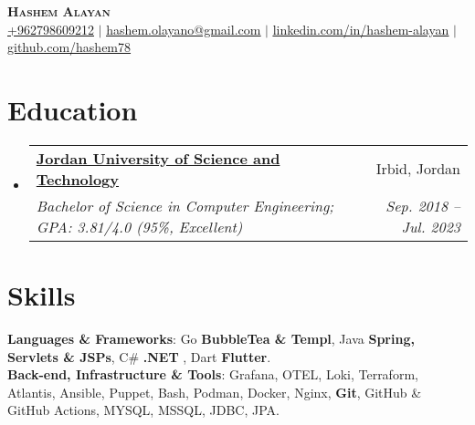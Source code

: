 \documentclass[letterpaper,11pt]{article}
\makeatletter
\newcommand{\resumeSubheading}[4]{
  \vspace{-2pt}\item
    \begin{tabular*}{0.97\textwidth}[t]{l@{\extracolsep{\fill}}r}
      \textbf{#1} & #2 \\
      \textit{\small#3} & \textit{\small #4} \\
    \end{tabular*}\vspace{-7pt}
}
\newcommand{\resumeSubHeadingListStart}{\begin{itemize}[leftmargin=0.0in, label={}]}
\newcommand{\resumeSubHeadingListEnd}{\end{itemize}}
\makeatother
\begin{document}
\begin{center}
    \textbf{\huge \scshape Hashem Alayan} \\ \vspace{1pt}
    \large \href{tel:+962798609212}{\underline{+962798609212}} $|$ \href{mailto:hashem.olayano@gmail.com}{\underline{hashem.olayano@gmail.com}} $|$ 
    \href{https://linkedin.com/in/hashem-alayan}{\underline{linkedin.com/in/hashem-alayan}} $|$
    \href{https://github.com/hashem78}{\underline{github.com/hashem78}}
\end{center}

\section{Education}
  \resumeSubHeadingListStart
    \resumeSubheading
      {\href{https://www.just.edu.jo/}{Jordan University of Science and Technology}}{Irbid, Jordan}
      {Bachelor of Science in Computer Engineering;  GPA: 3.81/4.0 (95\%, Excellent)}{Sep. 2018 -- Jul. 2023}   
  \resumeSubHeadingListEnd

%
\section{Skills}
\small{
    \textbf{Languages \& Frameworks}: Go \textbf{BubbleTea \& Templ}, Java \textbf{Spring, Servlets \& JSPs}, C\# \textbf{.NET} , Dart \textbf{Flutter}.
    \\
    \textbf{Back-end, Infrastructure \& Tools}: Grafana, OTEL, Loki, Terraform, Atlantis, Ansible, Puppet, Bash, Podman, Docker, Nginx, \textbf{Git}, GitHub \& GitHub Actions, MYSQL, MSSQL, JDBC, JPA.
}
\end{document}
